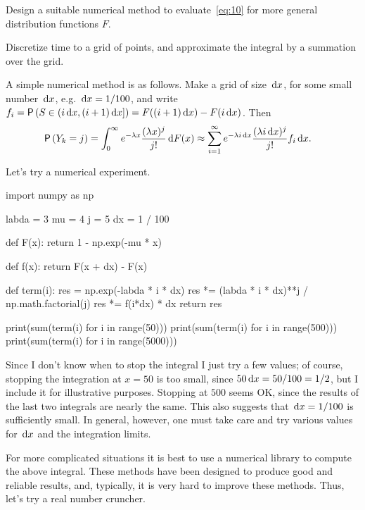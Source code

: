 \documentclass[companion]{subfiles}
\begin{document}
\begin{exercise} 
Design a suitable numerical method to evaluate~\cref{eq:10} for more general distribution functions $F$.
\begin{hint}
Discretize time to a grid of points, and approximate the integral by a summation over the grid.
\end{hint}
\begin{solution}
 A simple numerical method is as follows.
 Make a grid of size $\,\text{d}x$, for some small number $\,\text{d}x$, e.g.
 $\,\text{d}x=1/100$, and write $f_i = \P{S\in(i\d x, (i+1)\d x]} = F((i+1)\d x) - F(i\d x)$.
 Then
 \begin{equation*}
 \begin{split}
 \P{Y_k = j} 
&= \int_0^\infty e^{-\lambda x}\frac{(\lambda x)^j}{j!} \d F(x) 
\approx \sum_{i=1}^\infty e^{-\lambda i \d x}\frac{(\lambda i\d x)^j}{j!} f_i \d x.
 \end{split}
\end{equation*}

Let's try a numerical experiment. 

\begin{pyconsole}
import numpy as np

labda = 3
mu = 4
j = 5
dx = 1 / 100


def F(x):
 return 1 - np.exp(-mu * x)


def f(x):
 return F(x + dx) - F(x)


def term(i):
 res = np.exp(-labda * i * dx)
 res *= (labda * i * dx)**j / np.math.factorial(j)
 res *= f(i*dx) * dx
 return res

\end{pyconsole}

\begin{pyconsole}
print(sum(term(i) for i in range(50)))
print(sum(term(i) for i in range(500)))
print(sum(term(i) for i in range(5000)))
\end{pyconsole}

Since I don't know when to stop the integral I just try a few values; of course, stopping the integration at $x=50$ is too small, since $50\,\text{d}x=50/100=1/2$, but I include it for illustrative purposes.
Stopping at $500$ seems OK, since the results of the last two integrals are nearly the same.
This also suggests that $\,\text{d}x=1/100$ is sufficiently small.
In general, however, one must take care and try various values for $\,\text{d}x$ and the integration limits.


For more complicated situations it is best to use a numerical library to compute the above integral.
These methods have been designed to produce good and reliable results, and, typically, it is very hard to improve these methods.
Thus, let's try a real number cruncher.


\end{solution}
\end{exercise}
\end{document}
